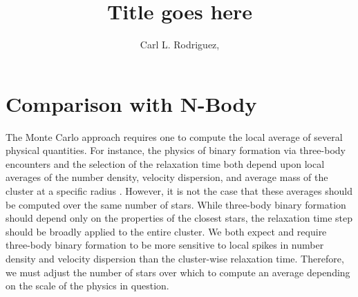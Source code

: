 \documentclass[11pt,a4paper]{emulateapj}
\begin{document}
\title{Title goes here} 
  \author{Carl L. Rodriguez,}



\section{Comparison with N-Body}

The Monte Carlo approach requires one to compute the local average of several
physical quantities.  For instance, the physics of binary formation via
three-body encounters and the selection of the relaxation time both depend upon
local averages of the number density, velocity dispersion, and average mass of
the cluster at a specific radius \citep{2005MNRAS.358..572I,Joshi:2000tv}.
However, it is not the case that these averages should be computed over the same
number of stars.   While three-body binary formation should depend only on the
properties of the closest stars, the relaxation time step should be broadly
applied to the entire cluster.  We both expect and require three-body binary
formation to be more sensitive to local spikes in number density and velocity
dispersion than the cluster-wise relaxation time.  Therefore, we must adjust the
number of stars over which to compute an average depending on the scale of the
physics in question.
\end{document}
